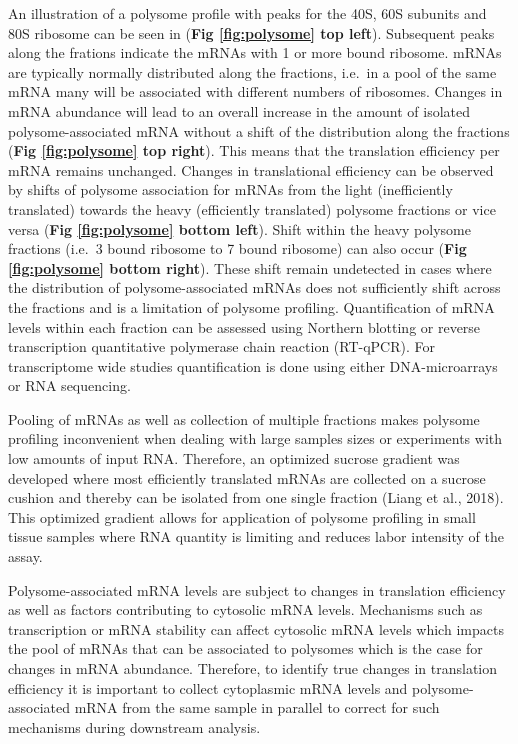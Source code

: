 \documentclass[
  12pt,
  openany]{book}
\begin{document}
An illustration of a polysome profile with peaks for the 40S, 60S subunits and 80S ribosome can be seen in (\textbf{Fig \ref{fig:polysome} top left}). Subsequent peaks along the frations indicate the mRNAs with 1 or more bound ribosome. mRNAs are typically normally distributed along the fractions, i.e.~in a pool of the same mRNA many will be associated with different numbers of ribosomes. Changes in mRNA abundance will lead to an overall increase in the amount of isolated polysome-associated mRNA without a shift of the distribution along the fractions (\textbf{Fig \ref{fig:polysome} top right}). This means that the translation efficiency per mRNA remains unchanged. Changes in translational efficiency can be observed by shifts of polysome association for mRNAs from the light (inefficiently translated) towards the heavy (efficiently translated) polysome fractions or vice versa (\textbf{Fig \ref{fig:polysome} bottom left}). Shift within the heavy polysome fractions (i.e.~3 bound ribosome to 7 bound ribosome) can also occur (\textbf{Fig \ref{fig:polysome} bottom right}). These shift remain undetected in cases where the distribution of polysome-associated mRNAs does not sufficiently shift across the fractions and is a limitation of polysome profiling. Quantification of mRNA levels within each fraction can be assessed using Northern blotting or reverse transcription quantitative polymerase chain reaction (RT-qPCR). For transcriptome wide studies quantification is done using either DNA-microarrays or RNA sequencing.

Pooling of mRNAs as well as collection of multiple fractions makes polysome profiling inconvenient when dealing with large samples sizes or experiments with low amounts of input RNA. Therefore, an optimized sucrose gradient was developed where most efficiently translated mRNAs are collected on a sucrose cushion and thereby can be isolated from one single fraction (Liang et al., 2018). This optimized gradient allows for application of polysome profiling in small tissue samples where RNA quantity is limiting and reduces labor intensity of the assay.

Polysome-associated mRNA levels are subject to changes in translation efficiency as well as factors contributing to cytosolic mRNA levels. Mechanisms such as transcription or mRNA stability can affect cytosolic mRNA levels which impacts the pool of mRNAs that can be associated to polysomes which is the case for changes in mRNA abundance. Therefore, to identify true changes in translation efficiency it is important to collect cytoplasmic mRNA levels and polysome-associated mRNA from the same sample in parallel to correct for such mechanisms during downstream analysis.
\end{document}
